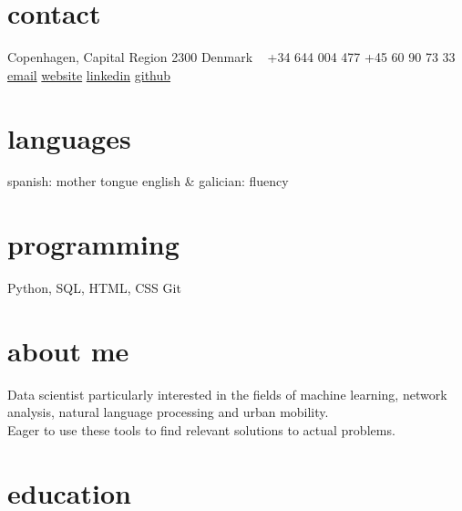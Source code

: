 \documentclass[]{friggeri-cv-a4}
\begin{document}


\begin{aside} %
\section{contact}
Copenhagen, Capital Region 2300
Denmark
~
+34 644 004 477
+45 60 90 73 33
~
\href{mailto:carobrasor@gmail.com}{email}
\href{https://carobs9.github.io/}{website}
\href{https://www.linkedin.com/in/carolinabranas/}{linkedin}
\href{https://github.com/carobs9}{github}
\section{languages}
spanish: mother tongue
english \& galician: fluency
\section{programming}
Python, SQL, HTML, CSS
Git
\end{aside}


\section{about me}

Data scientist particularly interested in the fields of machine learning, network analysis, natural language processing and urban mobility. \\
Eager to use these tools to find relevant solutions to actual problems.



\section{education}
\end{document}
